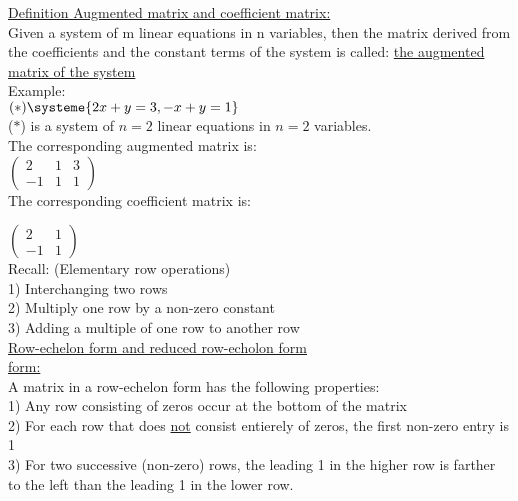 \documentclass{jhwhw}
\begin{document}
\underline{Definition Augmented matrix and coefficient matrix:}\\

Given a system of m linear equations in n variables, then the matrix derived from the coefficients and the constant terms of the system is called: \underline{the augmented matrix of the system}\\

Example:
\\

\((\ast) \systeme{2x+y=3, -x+y=1}\)\\
(\(\ast\)) is a system of \(n=2\) linear equations in \(n=2\) variables.\\
The corresponding augmented matrix is:\\

\(\begin{pmatrix} 2 & 1 & 3 \\ -1 & 1 & 1 \end{pmatrix}\)\\

The corresponding coefficient matrix is:

\(\begin{pmatrix} 2 & 1 \\ -1 & 1 \end{pmatrix}\)\\

Recall: (Elementary row operations)\\
1) Interchanging two rows\\
2) Multiply one row by a non-zero constant\\
3) Adding a multiple of one row to another row\\

\underline{Row-echelon form and reduced row-echolon form}\\

\underline{form:}\\
A matrix in a row-echelon form has the following properties:\\

1) Any row consisting of zeros occur at the bottom of the matrix\\

2) For each row that does \underline{not} consist entierely of zeros, the first non-zero entry is 1\\

3) For two successive (non-zero) rows, the leading 1 in the higher row is farther to the left than the leading 1 in the lower row.\\
\end{document}
